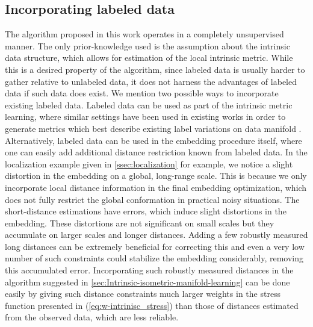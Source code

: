 	\subsection{Incorporating labeled data}
		\label{subsec:Incorporating-labeled-data}
	
	The algorithm proposed in this work operates in a completely unsupervised
	manner. The only prior-knowledge used is the assumption about the
	intrinsic data structure, which allows for estimation of the local
	intrinsic metric. While this is a desired property of the algorithm,
	since labeled data is usually harder to gather relative to unlabeled
	data, it does not harness the advantages of labeled data if such data
	does exist. We mention two possible ways to incorporate existing labeled
	data. Labeled data can be used as part of the intrinsic metric learning,
	where similar settings have been used in existing works in order to
	generate metrics which best describe existing label variations on
	data manifold \cite{yang2006distance,xing2003distance}. Alternatively,
	labeled data can be used in the embedding procedure itself, where
	one can easily add additional distance restriction known from labeled
	data. In the localization example given in \cref{ssec:localization}
	for example, we notice a slight distortion in the embedding on a global,
	long-range scale. This is because we only incorporate local distance
	information in the final embedding optimization, which does not fully
	restrict the global conformation in practical noisy situations. The
	short-distance estimations have errors, which induce slight distortions
	in the embedding. These distortions are not significant on small scales
	but they accumulate on larger scales and longer distances. Adding
	a few robustly measured long distances can be extremely beneficial
	for correcting this and even a very low number of such constraints
	could stabilize the embedding considerably, removing this accumulated
	error. Incorporating such robustly measured distances in the algorithm
	suggested in \cref{sec:Intrinsic-isometric-manifold-learning}
	can be done easily by giving such distance constraints much larger
	weights in the stress function presented in (\cref{eq:w-intrinisc_stress})
	than those of distances estimated from the observed data, which are
	less reliable.